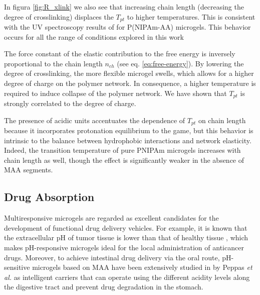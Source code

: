 In figura \ref{fig:R_xlink} we also see that increasing chain length (decreasing the degree of crosslinking) displaces the $T_{pt}$ to higher temperatures.
This is consistent with the UV spectroscopy results of  for P(NIPAm-AA) microgels.
This behavior occurs for all the range of conditions explored in this work %


The force constant of the elastic contribution to the free energy is inversely proportional to the chain length $n_{ch}$ (see eq. \ref{eq:free-energy}).
By lowering the degree of crosslinking, the more flexible microgel swells, which allows for a higher degree of charge on the polymer network.
In consequence, a higher temperature is required to induce collapse of the polymer network.
We have shown that $T_{pt}$ is strongly correlated to the degree of charge.


The presence of acidic units accentuates the dependence of $T_{pt}$ on chain length because it incorporates protonation equilibrium to the game, but this behavior is intrinsic to the balance between hydrophobic interactions and network elasticity.
Indeed, the transition temperature of pure PNIPAm microgels increases with chain length as well, though the effect is significantly weaker in the absence of MAA segments.



\subsection{Drug Absorption}




Multiresponsive microgels are regarded as excellent candidates for the development of functional drug delivery vehicles.
For example, it is known that the extracellular pH of tumor tissue is lower than that of healthy tissue \addcite[Gerweck1996], which makes pH-responsive microgels
ideal for the local administration of anticancer drugs\addcite[Dadsetan2013].
Moreover, to achieve intestinal drug delivery via the oral route,
pH-sensitive microgels based on MAA have been extensively studied in by Peppas \emph{et al.} as intelligent carriers that can operate using the different acidity levels along the digestive tract and prevent drug degradation in the stomach.







